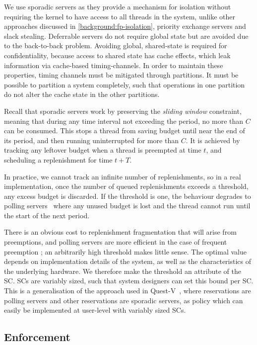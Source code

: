 We use sporadic servers as they provide a mechanism for isolation without requiring the kernel
to have access to all threads in the system, unlike other approaches discussed in
\cref{background:fp-isolation}, \eg  priority exchange servers and slack stealing.
Deferrable servers do not require global state but are avoided due to the back-to-back
problem.
Avoiding global, shared-state is required for confidentiality, because access to shared state
has cache effects, which leak information via cache-based timing-channels. In order to maintain these properties,
timing channels must be mitigated through partitions. 
It must be possible to partition a system completely, such that operations in one partition do not
alter the cache state in the other partitions.

Recall that sporadic servers work by preserving the
\emph{sliding window} constraint, meaning that during any time
interval not exceeding the period, no more than $C$ can be consumed.
This stops a thread from saving budget until near the end of its
period, and then running uninterrupted for more than $C$. It is achieved by tracking any leftover
budget when
a thread is preempted at time \(t\), and scheduling a replenishment for time  $t+T$.

In practice, we cannot track an infinite number of
replenishments, so in a real implementation, once the number of
queued replenishments exceeds a threshold, any excess budget is
discarded. If the threshold is one, the behaviour degrades to polling
servers~\citep{Sprunt_SL_89a} where any unused budget is lost and the
thread cannot run until the start of the next period. 

There is an obvious cost to replenishment fragmentation that will
arise from preemptions, and polling servers are more efficient in the
case of frequent preemption \citep{Li_WCM_14}; an arbitrarily high
threshold makes little sense. The optimal value depends on
implementation details of the system, as well as the characteristics
of the underlying hardware.
We therefore make the threshold an attribute of the SC. \glspl{SC} are variably sized,
such that system designers can set this bound per SC. This is a generalisation of the approach used
in Quest-V~\citep{Danish_LW_11}, where \IO reservations are polling servers and other reservations 
are sporadic servers, as policy which can easily be implemented at user-level with variably sized
\glspl{SC}.

\subsection{Enforcement}
\label{sec:model-enforcement}

